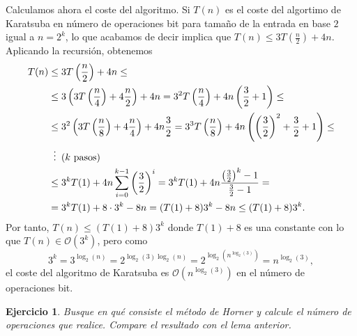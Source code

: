 \documentclass[10pt,a4paper]{article}
\theoremstyle{plain}
\newtheorem{ejer}{Ejercicio}
\theoremstyle{definition}
\begin{document}
Calculamos ahora el coste del algoritmo. Si $T(n)$ es el coste del algortimo de Karatsuba en número de operaciones bit para tamaño de la entrada en base $2$ igual a $n=2^k$, lo que acabamos de decir implica que $T(n)\leq 3T(\frac{n}{2})+4n$. Aplicando la recursión, obtenemos
\begin{align*}
T(n) &\leq 3T\left(\frac{n}{2}\right)+4n\leq \\
& \leq 3\left(3T\left(\frac{n}{4}\right)+4\frac{n}{2}\right)+4n=3^2T\left(\frac{n}{4}\right)+4n\left(\frac{3}{2}+1\right)\leq\\
& \leq 3^2\left(3T\left(\frac{n}{8}\right)+4\frac{n}{4}\right)+4n\frac{3}{2}= 3^3T\left(\frac{n}{8}\right)+4n\left(\left(\frac{3}{2}\right)^2+\frac{3}{2}+1\right)\leq \\
& \vdotswithin{\leq}\text{($k$ pasos)}\\
&\leq 3^kT(1)+4n\sum_{i=0}^{k-1}\left(\frac{3}{2}\right)^i=3^kT(1)+4n\frac{\left(\frac{3}{2}\right)^k-1}{\frac{3}{2}-1}=\\
& = 3^kT(1)+8\cdot 3^k-8n= (T(1)+8)3^k-8n\leq (T(1)+8)3^k.
\end{align*}
Por tanto, $T(n)\leq (T(1)+8)3^k$ donde $T(1)+8$ es una constante con lo que $T(n)\in\mathcal{O}\left(3^k\right)$, pero como
$$3^k=3^{\log_2(n)}=2^{\log_2(3)\log_2(n)}=2^{\log_2\left(n^{\log_2(3)}\right)}=n^{\log_2(3)},$$
el coste del algoritmo de Karatsuba es $\mathcal{O}\left(n^{\log_2(3)}\right)$ en el número de operaciones bit.
\begin{ejer} Busque en qué consiste el método de Horner y calcule el número de operaciones que realice. Compare el resultado con el lema anterior.
\end{ejer}
\end{document}
